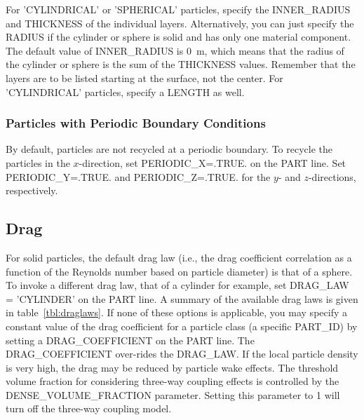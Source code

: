 \documentclass[11pt]{book}
\begin{document}
For  {\ct 'CYLINDRICAL'} or {\ct 'SPHERICAL'} particles, specify the {\ct INNER\_RADIUS} and {\ct THICKNESS} of the individual layers. Alternatively, you can just specify the {\ct RADIUS} if the cylinder or sphere is solid and has only one material component. The default value of {\ct INNER\_RADIUS} is 0~m, which means that the radius of the cylinder or sphere is the sum of the {\ct THICKNESS} values. Remember that the layers are to be listed starting at the surface, not the center. For {\ct 'CYLINDRICAL'} particles, specify a {\ct LENGTH} as well.

\subsubsection{Particles with Periodic Boundary Conditions}
\label{info:periodic-particles}

By default, particles are not recycled at a periodic boundary. To recycle the particles in the $x$-direction, set {\ct PERIODIC\_X=.TRUE.} on the {\ct PART} line. Set {\ct PERIODIC\_Y=.TRUE.} and {\ct PERIODIC\_Z=.TRUE.} for the $y$- and $z$-directions, respectively.


\subsection{Drag}
\label{info:particle_drag}

For solid particles, the default drag law (i.e., the drag coefficient correlation as a function of the Reynolds number based on particle diameter) is that of a sphere. To invoke a different drag law, that of a cylinder for example, set {\ct DRAG\_LAW = 'CYLINDER'} on the {\ct PART} line. A summary of the available drag laws is given in table~\ref{tbl:draglaws}. If none of these options is applicable, you may specify a constant value of the drag coefficient for a particle class (a specific {\ct PART\_ID}) by setting a {\ct DRAG\_COEFFICIENT} on the {\ct PART} line. The {\ct DRAG\_COEFFICIENT} over-rides the {\ct DRAG\_LAW}. If the local particle density is very high, the drag may be reduced by particle wake effects. The threshold volume fraction for considering three-way coupling effects is controlled by the {\ct DENSE\_VOLUME\_FRACTION} parameter. Setting this parameter to 1 will turn off the three-way coupling model.
\end{document}
